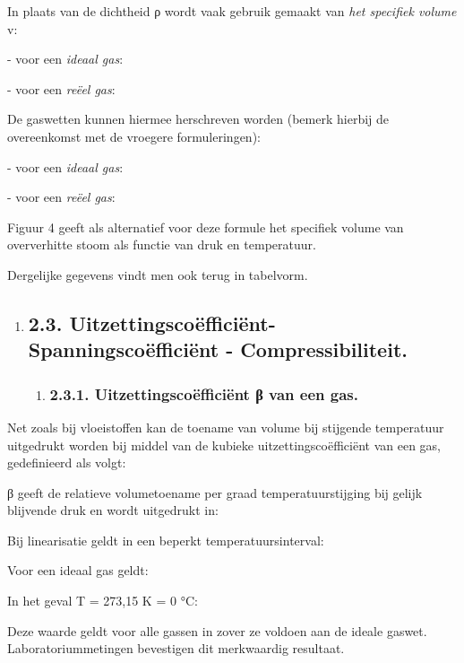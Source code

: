 \documentclass[]{article}
\begin{document}
In plaats van de dichtheid ρ wordt vaak gebruik gemaakt van \emph{het
specifiek volume} v:

- voor een \emph{ideaal gas}:

- voor een \emph{reëel gas}:

De gaswetten kunnen hiermee herschreven worden (bemerk hierbij de
overeenkomst met de vroegere formuleringen):

- voor een \emph{ideaal gas}:

- voor een \emph{reëel gas}:

Figuur 4 geeft als alternatief voor deze formule het specifiek volume
van oververhitte stoom als functie van druk en temperatuur.

Dergelijke gegevens vindt men ook terug in tabelvorm.

\begin{enumerate}
\item
  \subsection{2.3. Uitzettingscoëfficiënt- Spanningscoëfficiënt -
  Compressibiliteit.
  }\label{uitzettingscouxebfficiuxebnt--spanningscouxebfficiuxebnt---compressibiliteit.}

  \begin{enumerate}
  \item
    \subsubsection{2.3.1. Uitzettingscoëfficiënt β van een
    gas.}\label{uitzettingscouxebfficiuxebnt-ux3b2-van-een-gas.}
  \end{enumerate}
\end{enumerate}

Net zoals bij vloeistoffen kan de toename van volume bij stijgende
temperatuur uitgedrukt worden bij middel van de kubieke
uitzettingscoëfficiënt van een gas, gedefinieerd als volgt:

β geeft de relatieve volumetoename per graad temperatuurstijging bij
gelijk blijvende druk en wordt uitgedrukt in:

Bij linearisatie geldt in een beperkt temperatuursinterval:

Voor een ideaal gas geldt:

In het geval T = 273,15 K = 0 °C:

Deze waarde geldt voor alle gassen in zover ze voldoen aan de ideale
gaswet. Laboratoriummetingen bevestigen dit merkwaardig resultaat.
\end{document}
